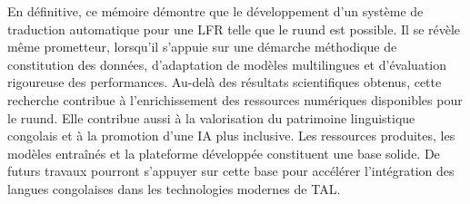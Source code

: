 En définitive, ce mémoire démontre que le développement d'un système de traduction automatique pour une \ac{LFR} telle que le ruund est possible. Il se révèle même prometteur, lorsqu'il s'appuie sur une démarche méthodique de constitution des données, d'adaptation de modèles multilingues et d'évaluation rigoureuse des performances. Au-delà des résultats scientifiques obtenus, cette recherche contribue à l'enrichissement des ressources numériques disponibles pour le ruund. Elle contribue aussi à la valorisation du patrimoine linguistique congolais et à la promotion d'une \ac{IA} plus inclusive. Les ressources produites, les modèles entraînés et la plateforme développée constituent une base solide. De futurs travaux pourront s'appuyer sur cette base pour accélérer l'intégration des langues congolaises dans les technologies modernes de \ac{TAL}.